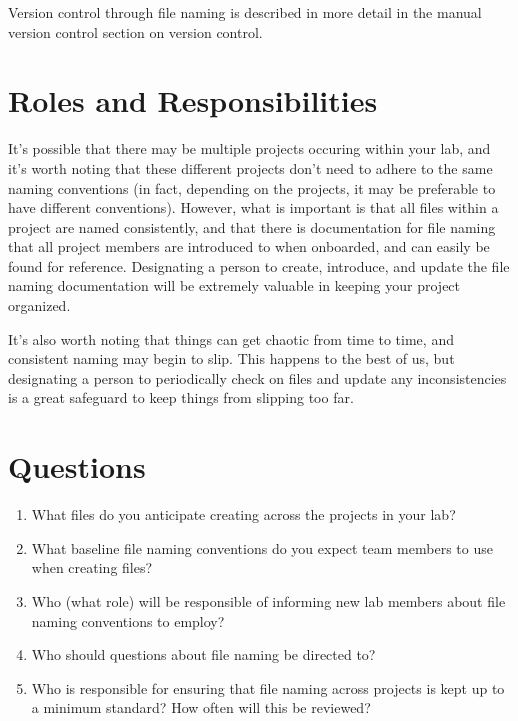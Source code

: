 \documentclass[
]{book}
\providecommand{\tightlist}{%
  \setlength{\itemsep}{0pt}\setlength{\parskip}{0pt}}
\begin{document}
Version control through file naming is described in more detail in the manual version control section on version control.

\hypertarget{roles-and-responsibilities}{%
\section*{Roles and Responsibilities}\label{roles-and-responsibilities}}

It's possible that there may be multiple projects occuring within your lab, and it's worth noting that these different projects don't need to adhere to the same naming conventions (in fact, depending on the projects, it may be preferable to have different conventions). However, what is important is that all files within a project are named consistently, and that there is documentation for file naming that all project members are introduced to when onboarded, and can easily be found for reference. Designating a person to create, introduce, and update the file naming documentation will be extremely valuable in keeping your project organized.

It's also worth noting that things can get chaotic from time to time, and consistent naming may begin to slip. This happens to the best of us, but designating a person to periodically check on files and update any inconsistencies is a great safeguard to keep things from slipping too far.

\hypertarget{questions-1}{%
\section*{Questions}\label{questions-1}}

\begin{enumerate}
\def\labelenumi{\arabic{enumi}.}
\tightlist
\item
  What files do you anticipate creating across the projects in your lab?
\item
  What baseline file naming conventions do you expect team members to use when creating files?
\item
  Who (what role) will be responsible of informing new lab members about file naming conventions to employ?
\item
  Who should questions about file naming be directed to?
\item
  Who is responsible for ensuring that file naming across projects is kept up to a minimum standard? How often will this be reviewed?
\end{enumerate}
\end{document}
